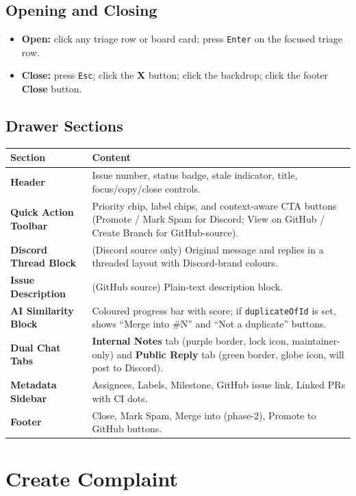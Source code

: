 \documentclass[12pt,a4paper]{report}
\begin{document}
\subsection{Opening and Closing}

\begin{itemize}
  \item \textbf{Open:} click any triage row or board card; press
    \texttt{Enter} on the focused triage row.
  \item \textbf{Close:} press \texttt{Esc}; click the \textbf{X} button;
    click the backdrop; click the footer \textbf{Close} button.
\end{itemize}

\subsection{Drawer Sections}

\begin{longtable}{>{\bfseries}p{4cm} p{9cm}}
\toprule
Section & Content \\
\midrule
\endhead
Header & Issue number, status badge, stale indicator, title, focus/copy/close
  controls. \\
Quick Action Toolbar & Priority chip, label chips, and context-aware CTA
  buttons (Promote / Mark Spam for Discord; View on GitHub / Create Branch for
  GitHub-source). \\
Discord Thread Block & (Discord source only) Original message and replies in
  a threaded layout with Discord-brand colours. \\
Issue Description & (GitHub source) Plain-text description block. \\
AI Similarity Block & Coloured progress bar with score; if
  \texttt{duplicateOfId} is set, shows ``Merge into \#N'' and ``Not a
  duplicate'' buttons. \\
Dual Chat Tabs & \textbf{Internal Notes} tab (purple border, lock icon,
  maintainer-only) and \textbf{Public Reply} tab (green border, globe icon,
  will post to Discord). \\
Metadata Sidebar & Assignees, Labels, Milestone, GitHub issue link, Linked
  PRs with CI dots. \\
Footer & Close, Mark Spam, Merge into (phase-2), Promote to GitHub buttons. \\
\bottomrule
\end{longtable}

\section{Create Complaint}
\end{document}
